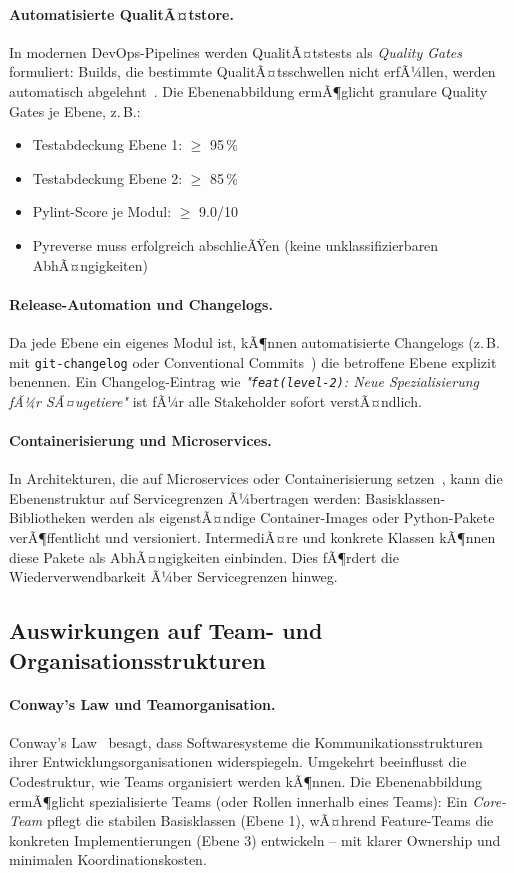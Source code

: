 ﻿\documentclass[a4paper,12pt]{article}
\begin{document}
\paragraph{Automatisierte QualitÃ¤tstore.}
In modernen DevOps-Pipelines werden QualitÃ¤tstests als \textit{Quality Gates}
formuliert: Builds, die bestimmte QualitÃ¤tsschwellen nicht erfÃ¼llen, werden
automatisch abgelehnt~\cite{humble2010}. Die Ebenenabbildung ermÃ¶glicht granulare
Quality Gates je Ebene, z.\,B.:
\begin{itemize}[leftmargin=*]
	\item Testabdeckung Ebene 1: $\geq$ 95\,\%
	\item Testabdeckung Ebene 2: $\geq$ 85\,\%
	\item Pylint-Score je Modul: $\geq$ 9.0/10
	\item Pyreverse muss erfolgreich abschlieÃŸen (keine unklassifizierbaren AbhÃ¤ngigkeiten)
\end{itemize}

\paragraph{Release-Automation und Changelogs.}
Da jede Ebene ein eigenes Modul ist, kÃ¶nnen automatisierte Changelogs
(z.\,B. mit \texttt{git-changelog} oder Conventional Commits~\cite{convcommits2024})
die betroffene Ebene explizit benennen. Ein Changelog-Eintrag wie
\textit{"\texttt{feat(level-2)}: Neue Spezialisierung fÃ¼r SÃ¤ugetiere"} ist
fÃ¼r alle Stakeholder sofort verstÃ¤ndlich.

\paragraph{Containerisierung und Microservices.}
In Architekturen, die auf Microservices oder Containerisierung setzen~\cite{newman2015},
kann die Ebenenstruktur auf Servicegrenzen Ã¼bertragen werden: Basisklassen-Bibliotheken
werden als eigenstÃ¤ndige Container-Images oder Python-Pakete verÃ¶ffentlicht und
versioniert. IntermediÃ¤re und konkrete Klassen kÃ¶nnen diese Pakete als AbhÃ¤ngigkeiten
einbinden. Dies fÃ¶rdert die Wiederverwendbarkeit Ã¼ber Servicegrenzen hinweg.

\subsection{Auswirkungen auf Team- und Organisationsstrukturen}

\paragraph{Conway's Law und Teamorganisation.}
Conway's Law~\cite{conway1968} besagt, dass Softwaresysteme die
Kommunikationsstrukturen ihrer Entwicklungsorganisationen widerspiegeln.
Umgekehrt beeinflusst die Codestruktur, wie Teams organisiert werden kÃ¶nnen.
Die Ebenenabbildung ermÃ¶glicht spezialisierte Teams (oder Rollen innerhalb
eines Teams): Ein \textit{Core-Team} pflegt die stabilen Basisklassen (Ebene 1),
wÃ¤hrend Feature-Teams die konkreten Implementierungen (Ebene 3) entwickeln --
mit klarer Ownership und minimalen Koordinationskosten.
\end{document}
